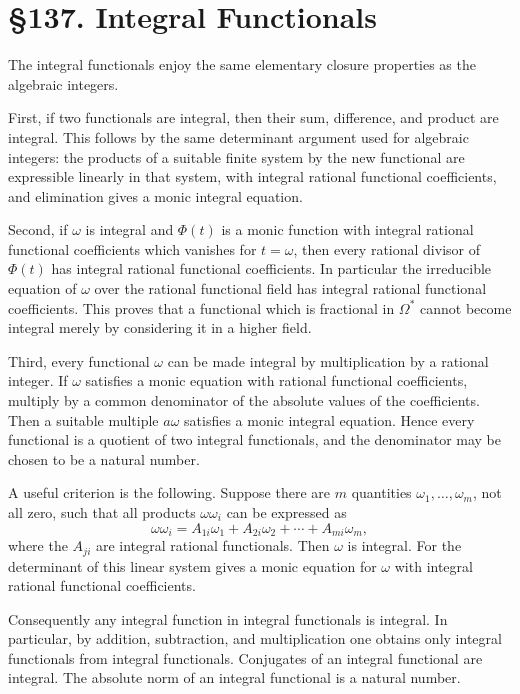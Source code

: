 \documentclass[12pt,a4paper]{article}
\newcommand{\webersection}[2]{\clearpage\section*{\S #1. #2}}
\begin{document}
\webersection{137}{Integral Functionals}

The integral functionals enjoy the same elementary closure properties as the algebraic integers.

First, if two functionals are integral, then their sum, difference, and product are integral.  This follows by the same determinant argument used for algebraic integers: the products of a suitable finite system by the new functional are expressible linearly in that system, with integral rational functional coefficients, and elimination gives a monic integral equation.

Second, if \(\omega\) is integral and \(\Phi(t)\) is a monic function with integral rational functional coefficients which vanishes for \(t=\omega\), then every rational divisor of \(\Phi(t)\) has integral rational functional coefficients.  In particular the irreducible equation of \(\omega\) over the rational functional field has integral rational functional coefficients.  This proves that a functional which is fractional in \(\Omega^*\) cannot become integral merely by considering it in a higher field.

Third, every functional \(\omega\) can be made integral by multiplication by a rational integer.  If \(\omega\) satisfies a monic equation with rational functional coefficients, multiply by a common denominator of the absolute values of the coefficients.  Then a suitable multiple \(a\omega\) satisfies a monic integral equation.  Hence every functional is a quotient of two integral functionals, and the denominator may be chosen to be a natural number.

A useful criterion is the following.  Suppose there are \(m\) quantities \(\omega_1,
\ldots,
\omega_m\), not all zero, such that all products \(\omega\omega_i\) can be expressed as
\begin{equation}
 \omega\omega_i=A_{1i}\omega_1+A_{2i}\omega_2+\cdots+A_{mi}\omega_m, \tag{1}
\end{equation}
where the \(A_{ji}\) are integral rational functionals.  Then \(\omega\) is integral.  For the determinant of this linear system gives a monic equation for \(\omega\) with integral rational functional coefficients.

Consequently any integral function in integral functionals is integral.  In particular, by addition, subtraction, and multiplication one obtains only integral functionals from integral functionals.  Conjugates of an integral functional are integral.  The absolute norm of an integral functional is a natural number.
\end{document}
